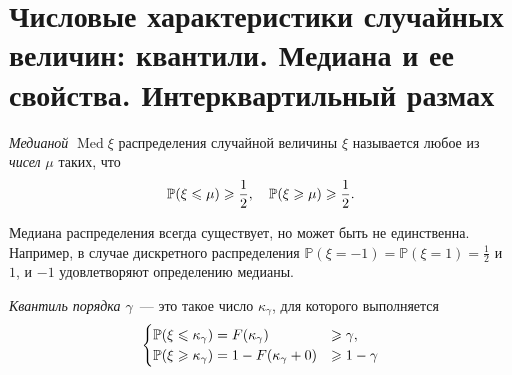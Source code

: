 \section {Числовые характеристики случайных величин: квантили. Медиана и ее свойства. Интерквартильный размах}

\begin{defn}
    \textit{Медианой} $\operatorname{Med} \xi$ распределения случайной величины $\xi$ называется любое из \textit{чисел} $\mu$ таких, что
    \begin{equation*}
        {\mathbb{P}(\xi \leqslant \mu)} \geqslant \frac{1}{2}, ~~~ {\mathbb{P}(\xi \geqslant \mu)} \geqslant \frac{1}{2}.
    \end{equation*}
\end{defn} 

\begin{rmrk}
    Медиана распределения всегда существует, но может быть не единственна. 
    Например, в случае дискретного распределения $\mathbb{P}(\xi = -1) = \mathbb{P}(\xi = 1) = \frac{1}{2}$ и $1$, и $-1$ удовлетворяют определению медианы.
\end{rmrk} 

\begin{defn}
\textit{Квантиль порядка $\gamma$}~--- это такое число $\kappa_\gamma$, для которого выполняется 
$$ \begin{cases} 
    {\mathbb{P}(\xi \leqslant \kappa_\gamma)} = F(\kappa_\gamma) & \geqslant \gamma, \\
    {\mathbb{P}(\xi \geqslant \kappa_\gamma)} = 1 - F(\kappa_\gamma + 0) & \geqslant 1 - \gamma 
\end{cases}
$$
\end{defn}


